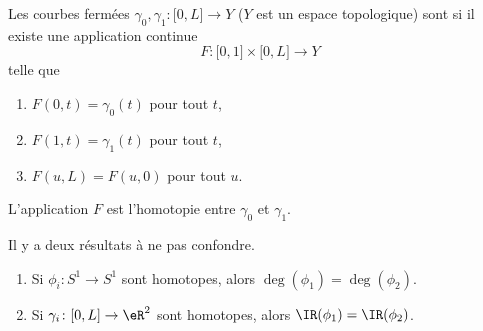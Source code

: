 \begin{definition}     \label{DEFooHJQTooYUFcee}
	Les courbes fermées \( \gamma_0,\gamma_1\colon \mathopen[ 0 , L \mathclose]\to Y\) (\( Y\) est un espace topologique) sont  si il existe une application continue
	\begin{equation}
		F\colon \mathopen[ 0 , 1 \mathclose]\times \mathopen[ 0 , L \mathclose]\to Y
	\end{equation}
	telle que
	\begin{enumerate}
		\item
		      \( F(0,t)=\gamma_0(t)\) pour tout \( t\),
		\item
		      \( F(1,t)=\gamma_1(t)\) pour tout \( t\),
		\item
		      \( F(u,L)=F(u,0)\) pour tout \( u\).
	\end{enumerate}
	L'application \( F\) est l'homotopie entre \( \gamma_0\) et \( \gamma_1\).
\end{definition}

\begin{proposition}      \label{PROPooZIAKooHqtnZj}
	Il y a deux résultats à ne pas confondre.
	\begin{enumerate}
		\item   \label{ITEMooLEHFooXEyTHY}
		      Si \( \phi_i\colon S^1\to S^1\) sont homotopes, alors \( \deg(\phi_1)=\deg(\phi_2)\).
		\item
		      Si \(\gamma_i\colon \mathopen[ 0 , L \mathclose]\to \eR^2 \) sont homotopes, alors \( \IR(\phi_1)=\IR(\phi_2)\).
	\end{enumerate}
\end{proposition}

